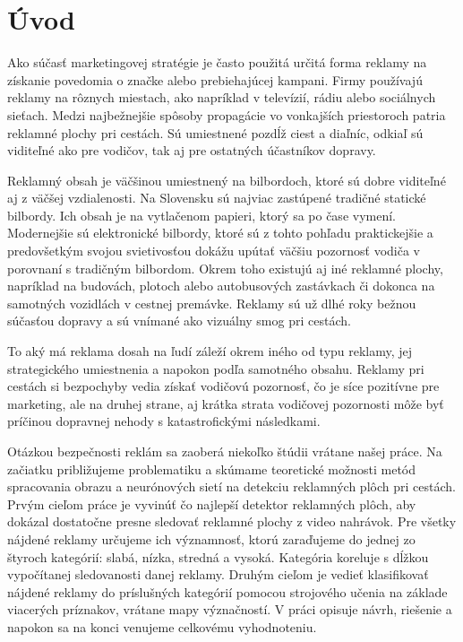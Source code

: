 \chapter*{Úvod}\label{chap:intro}


Ako súčasť marketingovej stratégie je často použitá určitá forma reklamy na získanie povedomia o značke alebo prebiehajúcej kampani. Firmy používajú reklamy na rôznych miestach, ako napríklad v televízií, rádiu alebo sociálnych sieťach. Medzi najbežnejšie spôsoby propagácie vo vonkajších priestoroch patria reklamné plochy pri cestách. Sú umiestnené pozdĺž ciest a diaľníc, odkiaľ sú viditeľné ako pre vodičov, tak aj pre ostatných účastníkov dopravy.

Reklamný obsah je väčšinou umiestnený na bilbordoch, ktoré sú dobre viditeľné aj z väčšej vzdialenosti. Na Slovensku sú najviac zastúpené tradičné statické bilbordy. Ich obsah je na vytlačenom papieri, ktorý sa po čase vymení. Modernejšie sú elektronické bilbordy, ktoré sú z tohto pohľadu praktickejšie a predovšetkým svojou svietivosťou dokážu upútať väčšiu pozornosť vodiča v porovnaní s tradičným bilbordom. Okrem toho existujú aj iné reklamné plochy, napríklad na budovách, plotoch alebo autobusových zastávkach či dokonca na samotných vozidlách v cestnej premávke. Reklamy sú už dlhé roky bežnou súčasťou dopravy a sú vnímané ako vizuálny smog pri cestách.

To aký má reklama dosah na ľudí záleží okrem iného od typu reklamy, jej strategického umiestnenia a napokon podľa samotného obsahu. Reklamy pri cestách si bezpochyby vedia získať vodičovú pozornosť, čo je síce pozitívne pre marketing, ale na druhej strane, aj krátka strata vodičovej pozornosti môže byť príčinou dopravnej nehody s katastrofickými následkami.

Otázkou bezpečnosti reklám sa zaoberá niekoľko štúdii vrátane našej práce. Na začiatku približujeme problematiku a skúmame teoretické možnosti metód spracovania obrazu a neurónových sietí na detekciu reklamných plôch pri cestách. Prvým cieľom práce je vyvinúť čo najlepší detektor reklamných plôch, aby dokázal dostatočne presne sledovať reklamné plochy z video nahrávok. Pre všetky nájdené reklamy určujeme ich významnosť, ktorú zaraďujeme do jednej zo štyroch kategórií: slabá, nízka, stredná a vysoká. Kategória koreluje s dĺžkou vypočítanej sledovanosti danej reklamy. Druhým cieľom je vedieť klasifikovať nájdené reklamy do príslušných kategórií pomocou strojového učenia na základe viacerých príznakov, vrátane mapy význačností. V práci opisuje návrh, riešenie a napokon sa na konci venujeme celkovému vyhodnoteniu.

